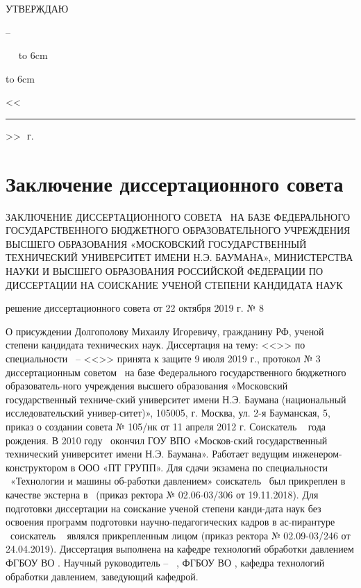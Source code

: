 
\hfill\parbox{6cm}{
	\centerline{УТВЕРЖДАЮ}
	\centerline{\leadingOrganizationHeadPos\---}
	\leadingOrganizationTitle
	
	\ktn~\leadingOrganizationHead\
	\linebreak
	{\hbox to 6cm{\hrulefill}}
	{\hbox to 6cm{<<\rule{7mm}{0.4pt}>>\hrulefill~\number\year\,г.}}}
\vspace{0.5cm}


\section{Заключение диссертационного совета}


ЗАКЛЮЧЕНИЕ ДИССЕРТАЦИОННОГО СОВЕТА \ НА БАЗЕ
ФЕДЕРАЛЬНОГО ГОСУДАРСТВЕННОГО БЮДЖЕТНОГО 
ОБРАЗОВАТЕЛЬНОГО УЧРЕЖДЕНИЯ ВЫСШЕГО ОБРАЗОВАНИЯ
«МОСКОВСКИЙ ГОСУДАРСТВЕННЫЙ ТЕХНИЧЕСКИЙ УНИВЕРСИТЕТ ИМЕНИ Н.Э. БАУМАНА», МИНИСТЕРСТВА НАУКИ И ВЫСШЕГО 
ОБРАЗОВАНИЯ РОССИЙСКОЙ ФЕДЕРАЦИИ ПО ДИССЕРТАЦИИ
НА СОИСКАНИЕ УЧЕНОЙ СТЕПЕНИ КАНДИДАТА НАУК

решение диссертационного совета от 22 октября 2019 г. № 8

О присуждении Долгополову Михаилу Игоревичу, гражданину РФ, ученой степени кандидата технических наук.
Диссертация на тему: <<\thesisTitle>> по специальности \thesisSpecialtyNumber\ -- <<\thesisSpecialtyTitle>> принята к защите 9 июля 2019 г., протокол № 3 диссертационным советом 
\defenseCouncilNumber\ на базе Федерального государственного бюджетного образователь-ного учреждения высшего образования «Московский государственный техниче-ский университет имени Н.Э. Баумана (национальный исследовательский универ-ситет)», 105005, г. Москва, ул. 2-я Бауманская, 5, приказ о создании совета 
№ 105/нк от 11 апреля 2012 г.
Соискатель \thesisAuthorLastName~ года рождения.
В 2010 году \thesisAuthorLastName~\thesisAuthorOtherNames окончил ГОУ ВПО «Москов-ский государственный технический университет имени Н.Э. Баумана». Работает 
ведущим инженером-конструктором в ООО «ПТ ГРУПП».
Для сдачи экзамена по специальности \thesisSpecialtyNumber\ «Технологии и машины об-работки давлением» соискатель \thesisAuthorLastName~\thesisAuthorOtherNames был прикреплен в качестве экстерна в \thesisOrganizationShort\ (приказ ректора № 02.06-03/306 
от 19.11.2018). Для подготовки диссертации на соискание ученой степени канди-дата наук без освоения программ подготовки научно-педагогических кадров в ас-пирантуре \thesisOrganizationShort\ соискатель \thesisAuthorLastName~\thesisAuthorOtherNames 
являлся прикрепленным лицом (приказ ректора № 02.09-03/246 от 24.04.2019).
Диссертация выполнена на кафедре технологий обработки давлением ФГБОУ ВО \thesisOrganizationShort.
Научный руководитель – \supervisorRegaliaShort\ \supervisorFio, ФГБОУ ВО \thesisOrganizationShort, кафедра 
технологий обработки давлением, заведующий кафедрой.

